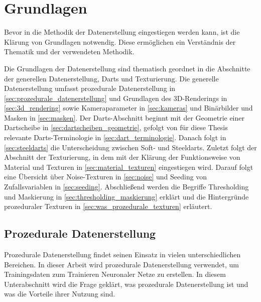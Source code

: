 
\section{Grundlagen}
\label{sec:daten:grundlagen}

Bevor in die Methodik der Datenerstellung eingestiegen werden kann, ist die Klärung von Grundlagen notwendig. Diese ermöglichen ein Verständnis der Thematik und der verwendeten Methodik.

Die Grundlagen der Datenerstellung sind thematisch geordnet in die Abschnitte der generellen Datenerstellung, Darts und Texturierung. Die generelle Datenerstellung umfasst prozedurale Datenerstellung in \autoref{sec:prozedurale_datenerstellung} und Grundlagen des 3D-Renderings in \autoref{sec:3d_rendering} sowie Kameraparameter in \autoref{sec:kameras} und Binärbilder und Masken in \autoref{sec:masken}. Der Darts-Abschnitt beginnt mit der Geometrie einer Dartscheibe in \autoref{sec:dartscheiben_geometrie}, gefolgt von für diese Thesis relevante Darts-Terminologie in \autoref{sec:dart_terminologie}. Danach folgt in \autoref{sec:steeldarts} die Unterscheidung zwischen Soft- und Steeldarts. Zuletzt folgt der Abschnitt der Texturierung, in dem mit der Klärung der Funktionsweise von Material und Texturen in \autoref{sec:material_texturen} eingestiegen wird. Darauf folgt eine Übersicht über Noise-Texturen in \autoref{sec:noise} und Seeding von Zufallsvariablen in \autoref{sec:seeding}. Abschließend werden die Begriffe Thresholding und Maskierung in \autoref{sec:thresholding_maskierung} erklärt und die Hintergründe prozeduraler Texturen in \autoref{sec:was_prozedurale_texturen} erläutert.


\subsection{Prozedurale Datenerstellung}  %
\label{sec:prozedurale_datenerstellung}

Prozedurale Datenerstellung findet seinen Einsatz in vielen unterschiedlichen Bereichen. In dieser Arbeit wird prozedurale Datenerstellung verwendet, um Trainingsdaten zum Trainieren Neuronaler Netze zu erstellen. In diesem Unterabschnitt wird die Frage geklärt, was prozedurale Datenerstellung ist und was die Vorteile ihrer Nutzung sind.

